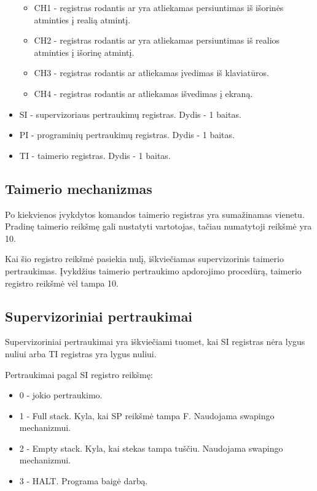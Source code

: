 \begin{itemize}
\begin{itemize}
		\item CH1 - registras rodantis ar yra atliekamas persiuntimas iš išorinės atminties į realią atmintį.
		\item CH2 - registras rodantis ar yra atliekamas persiuntimas iš realios atminties į išorinę atmintį.
		\item CH3 - registras rodantis ar atliekamas įvedimas iš klaviatūros.
		\item CH4 - registras rodantis ar atliekamas išvedimas į ekraną.
	\end{itemize}
	\item SI - supervizoriaus pertraukimų registras. Dydis - 1 baitas. 
	\item PI - programinių pertraukimų registras. Dydis - 1 baitas.
	\item TI - taimerio registras. Dydis - 1 baitas.
	
	\end{itemize}	
	
	\subsection{Taimerio mechanizmas}
	Po kiekvienos įvykdytos komandos taimerio registras yra sumažinamas vienetu. Pradinę taimerio reikšmę gali nustatyti vartotojas, tačiau numatytoji reikšmė yra 10.
	
	Kai šio registro reikšmė pasiekia nulį, iškviečiamas supervizorinis taimerio pertraukimas. Įvykdžius taimerio pertraukimo apdorojimo procedūrą, taimerio registro reikšmė vėl tampa 10.
	
	\subsection{Supervizoriniai pertraukimai}
	Supervizoriniai pertraukimai yra iškviečiami tuomet, kai SI registras nėra lygus nuliui arba TI registras yra lygus nuliui.
	
	Pertraukimai pagal SI registro reikšmę:
	\begin{itemize}
	\item 0 - jokio pertraukimo.
	\item 1 - Full stack. Kyla, kai SP reikšmė tampa F. Naudojama swapingo mechanizmui.
	\item 2 - Empty stack. Kyla, kai stekas tampa tuščiu. Naudojama swapingo mechanizmui.
	\item 3 - HALT. Programa baigė darbą. 
	\end{itemize}
	
